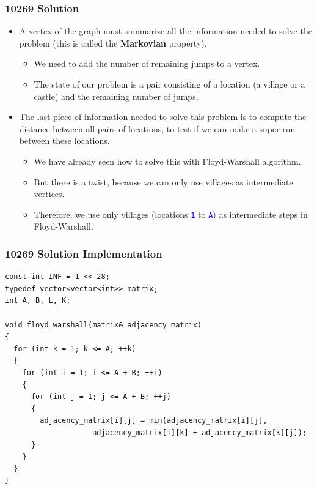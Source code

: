 \documentclass{beamer}
\begin{document}
\begin{frame}%
\frametitle{10269 Solution}


\footnotesize

\begin{itemize}

\item A vertex of the graph must summarize all the information needed to
solve the problem (this is called the \textbf{Markovian} property).
\begin{itemize}
\footnotesize
\vspace{0.1cm}
\item<2-> We need to add the number of remaining jumps to a vertex.
\vspace{0.1cm}
\item<2-> The state of our problem is a pair consisting of a location (a village or a castle) and the remaining
number of jumps.
\end{itemize}

\vspace{0.3cm}

\item<3-> The last piece of information needed to solve this problem is to compute the distance
between all pairs of locations, to test if we can make a super-run between these locations.
\begin{itemize}
\footnotesize
\vspace{0.1cm}
\item<4-> We have already seen how to solve this with Floyd-Warshall algorithm.
\vspace{0.1cm}
\item<4-> But there is a twist, because we can only use villages as intermediate vertices.
\vspace{0.1cm}
\item<5-> Therefore, we use only villages (locations \textcolor{blue}{\texttt{1}} to \textcolor{blue}{\texttt{A}}) as intermediate steps
in Floyd-Warshall.
\end{itemize}

\end{itemize}

\end{frame}

\begin{frame}[containsverbatim]
\frametitle{10269 Solution Implementation}
\scriptsize
\begin{lstlisting}
const int INF = 1 << 28;
typedef vector<vector<int>> matrix;
int A, B, L, K;

void floyd_warshall(matrix& adjacency_matrix)
{
  for (int k = 1; k <= A; ++k)
  {
    for (int i = 1; i <= A + B; ++i)
    {
      for (int j = 1; j <= A + B; ++j)
      {
        adjacency_matrix[i][j] = min(adjacency_matrix[i][j],
                    adjacency_matrix[i][k] + adjacency_matrix[k][j]);
      }
    }
  }
}
\end{lstlisting}

\end{frame}
\end{document}
